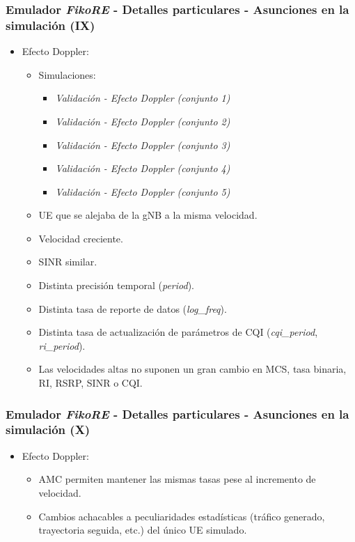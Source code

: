 \documentclass{beamer}
\begin{document}
\begin{frame}
\frametitle{Emulador \textit{FikoRE} - Detalles particulares - Asunciones en la simulación (IX)}

\begin{itemize}
\item {
	Efecto Doppler:
	\begin{itemize}
	\item {
		Simulaciones:
		\begin{itemize}
		\item \textit{Validación - Efecto Doppler (conjunto 1)}
		\item \textit{Validación - Efecto Doppler (conjunto 2)}
		\item \textit{Validación - Efecto Doppler (conjunto 3)}
		\item \textit{Validación - Efecto Doppler (conjunto 4)}
		\item \textit{Validación - Efecto Doppler (conjunto 5)}
		\end{itemize}
	}
	\item UE que se alejaba de la gNB a la misma velocidad.
	\item Velocidad creciente.
	\item SINR similar.
	\item Distinta precisión temporal (\textit{period}).
	\item Distinta tasa de reporte de datos (\textit{log\_freq}).
	\item Distinta tasa de actualización de parámetros de CQI (\textit{cqi\_period}, \textit{ri\_period}).
	\item Las velocidades altas no suponen un gran cambio en MCS, tasa binaria, RI, RSRP, SINR o CQI.
	\end{itemize}
}
\end{itemize}
\end{frame}

\begin{frame}
\frametitle{Emulador \textit{FikoRE} - Detalles particulares - Asunciones en la simulación (X)}

\begin{itemize}
\item {
	Efecto Doppler:
	\begin{itemize}
	\item AMC permiten mantener las mismas tasas pese al incremento de velocidad.
	\item Cambios achacables a peculiaridades estadísticas (tráfico generado, trayectoria seguida, etc.) del único UE simulado.
	\end{itemize}
}
\end{itemize}
\end{frame}
\end{document}
